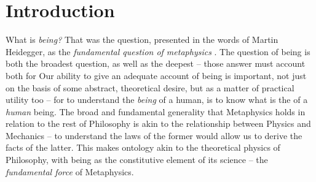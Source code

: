 \chapter{Introduction}





What is \emph{being?}  That was the question, presented in the words of Martin Heidegger, as the \emph{fundamental question of metaphysics} \autocite[1]{Heidegger}. The question of being is both the broadest question, as well as the deepest -- those answer must account both for  Our ability to give an adequate account of being is important, not just on the basis of some abstract, theoretical desire, but as a matter of practical utility too -- for to understand the \emph{being} of a human, is to know what is the  of a \emph{human} being. The broad and fundamental generality that Metaphysics holds in relation to the rest of Philosophy is akin to the relationship between Physics and Mechanics -- to understand the laws of the former would allow us to derive the facts of the latter. This makes ontology akin to the theoretical physics of Philosophy, with being as the constitutive element of its science -- the \emph{fundamental force} of Metaphysics.


